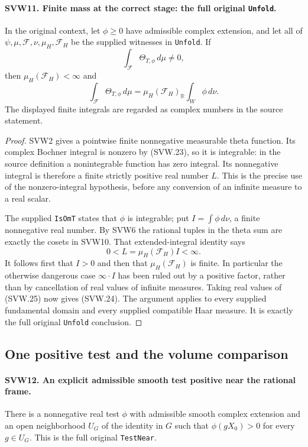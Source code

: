 \paragraph{SVW11. Finite mass at the correct stage: the full original \texttt{Unfold}.}
\label{claim:SVW11}
In the original context, let $\phi\geq0$ have admissible complex
extension, and let all of $\psi,\mu,\mathcal F,\nu,\mu_H,
\mathcal F_H$ be the supplied witnesses in \texttt{Unfold}.
If
\[
                  \int_{\mathcal F}\Theta_{T,\phi}\,d\mu\ne0,
 \tag{SVW.23}
\]
then $\mu_H(\mathcal F_H)<\infty$ and
\[
 \int_{\mathcal F}\Theta_{T,\phi}\,d\mu
          =\mu_H(\mathcal F_H)_{\mathbb R}
                                      \int_W\phi\,d\nu.
 \tag{SVW.24}
\]
The displayed finite integrals are regarded as complex numbers in
the source statement.

\begin{proof}
SVW2 gives a pointwise finite nonnegative measurable theta function.
Its complex Bochner integral is nonzero by (SVW.23), so it is
integrable: in the source definition a nonintegrable function has
zero integral.  Its nonnegative integral is therefore a finite
strictly positive real number $L$.  This is the precise use of
the nonzero-integral hypothesis, before any conversion of an
infinite measure to a real scalar.

The supplied \texttt{IsOmT} states that $\phi$ is integrable;
put $I=\int\phi\,d\nu$, a finite nonnegative real number.
By SVW6 the rational tuples in the theta sum are exactly the
cosets in SVW10.  That extended-integral identity says
\[
                       0<L=\mu_H(\mathcal F_H)I<\infty.
 \tag{SVW.25}
\]
It follows first that $I>0$ and then that
$\mu_H(\mathcal F_H)$ is finite.  In particular the otherwise
dangerous case $\infty\cdot I$ has been ruled out by a positive
factor, rather than by cancellation of real values of infinite
measures.  Taking real values of (SVW.25) now gives (SVW.24).
The argument applies to every supplied fundamental domain and
every supplied compatible Haar measure.  It is exactly the full
original \texttt{Unfold} conclusion.
\end{proof}

\subsection{One positive test and the volume comparison}

\paragraph{SVW12. An explicit admissible smooth test positive near the rational frame.}
\label{claim:SVW12}
There is a nonnegative real test $\phi$ with admissible smooth
complex extension and an open neighborhood $U_G$ of the identity
in $G$ such that $\phi(gX_0)>0$ for every $g\in U_G$.
This is the full original \texttt{TestNear}.

